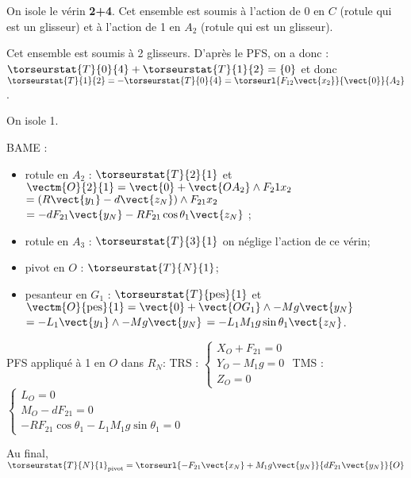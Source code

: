 \ifprof
\begin{corrige}
On isole le vérin \textbf{2+4}. Cet ensemble est soumis à l'action de 0 en $C$ (rotule qui est un glisseur)
et à l'action de 1 en $A_2$ (rotule qui est un glisseur). 

Cet ensemble est soumis à 2 glisseurs. D'après le PFS, on a donc : 
$\torseurstat{T}{0}{4} + \torseurstat{T}{1}{2} =\{0\}$ et donc 
$\torseurstat{T}{1}{2} = - \torseurstat{T}{0}{4} = \torseurl{F_{12}\vect{x_2}}{\vect{0}}{A_2} $.

\end{corrige}
\else
\fi


\ifprof
\begin{corrige}
On isole 1.

BAME : 
\begin{itemize}
\item rotule en $A_2$ : $\torseurstat{T}{2}{1}$ et $\vectm{O}{2}{1} = \vect{0}+\vect{OA_2}\wedge F_21{x_2}$ $=\left(R\vect{y_1} - d \vect{z_N}\right)\wedge F_{21}{x_2}$ $=-dF_{21}\vect{y_N}-RF_{21}\cos\theta_1 \vect{z_N}$ ;
\item rotule en $A_3$ : $\torseurstat{T}{3}{1}$ on néglige l'action de ce vérin;
\item pivot en $O$ : $\torseurstat{T}{N}{1}$;
\item pesanteur en $G_1$ : $\torseurstat{T}{\text{pes}}{1}$ et $\vectm{O}{\text{pes}}{1} = \vect{0}+\vect{OG_1}\wedge -Mg\vect{y_N}$ $=-L_1\vect{y_1}\wedge -Mg\vect{y_N}$ $=-L_1M_1g\sin\theta_1 \vect{z_N}$.
\end{itemize}

PFS appliqué à 1 en $O$  dans $R_N$:
TRS : 
$\left\{ \begin{array}{l}
X_O + F_{21} = 0 \\
Y_O - M_1 g = 0 \\
Z_O = 0
\end{array}
\right.$
TMS : 
$\left\{ \begin{array}{l}
L_O = 0 \\
M_O - dF_{21} = 0 \\
-RF_{21}\cos\theta_1  -L_1M_1g\sin\theta_1= 0
\end{array}
\right.$

Au final, $\torseurstat{T}{N}{1}_{\text{pivot}} = \torseurl{-F_{21}\vect{x_N}+M_1 g\vect{y_N} }{dF_{21} \vect{y_N}}{O}$
\end{corrige}
\else
\fi


